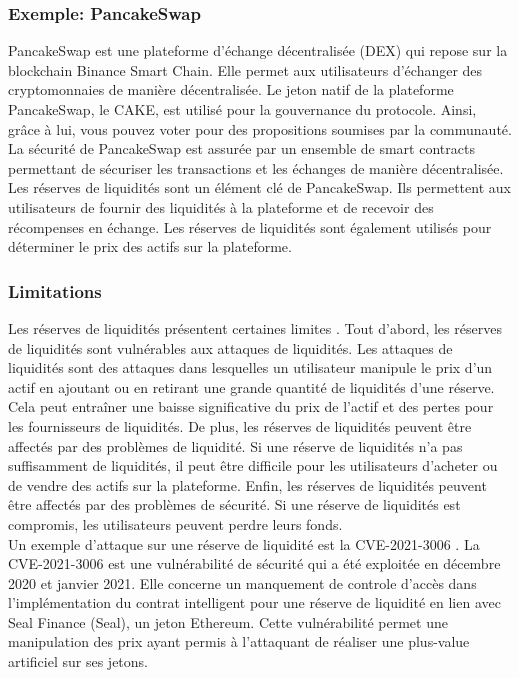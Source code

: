 \subsubsection{Exemple: PancakeSwap}
PancakeSwap est une plateforme d’échange décentralisée (DEX) qui repose sur la \gls{blockchain} Binance Smart Chain. \cite{augustin2022yield} Elle permet aux utilisateurs d’échanger des 
cryptomonnaies de manière décentralisée. Le jeton natif de la plateforme PancakeSwap, le CAKE, est utilisé 
pour la gouvernance du protocole. Ainsi, grâce à lui, vous pouvez voter pour des propositions soumises par la communauté. La sécurité de PancakeSwap est assurée 
par un ensemble de smart contracts permettant de sécuriser les transactions et les échanges de manière décentralisée. Les réserves de liquidités sont un 
élément clé de PancakeSwap. Ils permettent aux utilisateurs de fournir des liquidités à la plateforme et de recevoir des récompenses en échange. Les réserves 
de liquidités sont également utilisés pour déterminer le prix des actifs sur la plateforme.

\subsubsection{Limitations}
Les réserves de liquidités présentent certaines limites \cite{caldarelli2021blockchain}. Tout d’abord, les réserves de liquidités sont vulnérables aux attaques de liquidités. Les attaques 
de liquidités sont des attaques dans lesquelles un utilisateur manipule le prix d’un actif en ajoutant ou en retirant une grande quantité de liquidités d’une 
réserve. Cela peut entraîner une baisse significative du prix de l’actif et des pertes pour les fournisseurs de liquidités. De plus, les réserves de liquidités 
peuvent être affectés par des problèmes de liquidité. Si une réserve de liquidités n’a pas suffisamment de liquidités, il peut être difficile pour les 
utilisateurs d’acheter ou de vendre des actifs sur la plateforme. Enfin, les réserves de liquidités peuvent être affectés par des problèmes de sécurité. Si 
une réserve de liquidités est compromis, les utilisateurs peuvent perdre leurs fonds. \\
Un exemple d'attaque sur une réserve de liquidité est la CVE-2021-3006 \cite{nvd2021-3006,blocksec2021Seal}. La CVE-2021-3006 est une vulnérabilité de sécurité qui a été exploitée en décembre 
2020 et janvier 2021. Elle concerne un manquement de controle d'accès dans l’implémentation du contrat intelligent pour une réserve de liquidité en lien avec 
Seal Finance (Seal), un jeton Ethereum. Cette vulnérabilité permet une manipulation des prix ayant permis à l'attaquant de réaliser une plus-value artificiel 
sur ses jetons.

